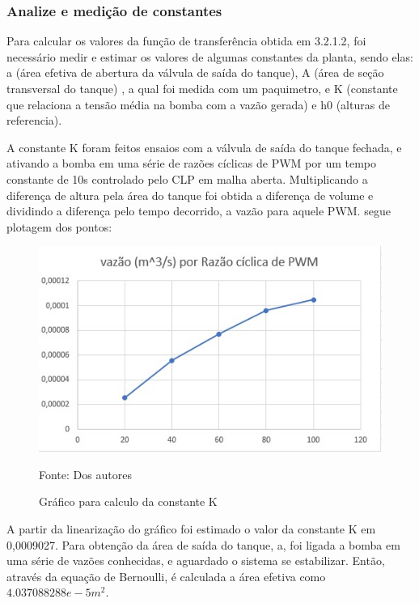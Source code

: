 \subsubsection{Analize e medição de constantes}
\hspace{11mm}Para calcular os valores da função de transferência obtida em 3.2.1.2, foi necessário medir e estimar os valores de algumas constantes da planta, sendo elas: a (área efetiva de abertura da válvula de saída do tanque), A (área de seção transversal do tanque) , a qual foi medida com um paquimetro, e K (constante que relaciona a tensão média na bomba com a vazão gerada) e h0 (alturas de referencia).

A constante K foram feitos ensaios com a válvula de saída do tanque fechada, e ativando a bomba em uma série de razões cíclicas de PWM por um tempo constante de 10s controlado pelo CLP em malha aberta. Multiplicando a diferença de altura pela área do tanque foi obtida a diferença de volume e dividindo a diferença pelo tempo decorrido, a vazão para aquele PWM. segue plotagem dos pontos:

\begin{figure}[H]
    \centering\footnotesize
    \caption{Gráfico para calculo da constante K}
    \begin{center}
        \includegraphics[scale=1]{imagens/graf0.jpeg}
    \end{center}
    \label{fig:graf0}
    \par Fonte: Dos autores
\end{figure}

A partir da linearização do gráfico foi estimado o valor da constante K em 0,0009027.
Para obtenção da área de saída do tanque, a, foi ligada a bomba em uma série de vazões conhecidas, e aguardado o sistema se estabilizar. Então, através da equação de Bernoulli, é calculada a área efetiva como $4.037088288e-5 m^2$.

